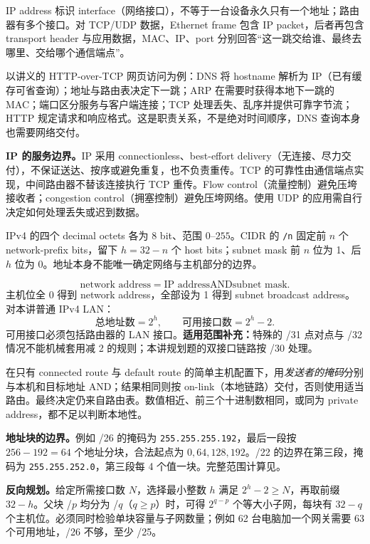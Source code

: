 IP address 标识 interface（网络接口），不等于一台设备永久只有一个地址；路由器有多个接口。对 TCP/UDP 数据，Ethernet frame 包含 IP packet，后者再包含 transport header 与应用数据，MAC、IP、port 分别回答“这一跳交给谁、最终去哪里、交给哪个通信端点”。

以讲义的 HTTP-over-TCP 网页访问为例：DNS 将 hostname 解析为 IP（已有缓存可省查询）；地址与路由表决定下一跳；ARP 在需要时获得本地下一跳的 MAC；端口区分服务与客户端连接；TCP 处理丢失、乱序并提供可靠字节流；HTTP 规定请求和响应格式。这是职责关系，不是绝对时间顺序，DNS 查询本身也需要网络交付。

\textbf{IP 的服务边界。}IP 采用 connectionless、best-effort delivery（无连接、尽力交付），不保证送达、按序或避免重复，也不负责重传。TCP 的可靠性由通信端点实现，中间路由器不替该连接执行 TCP 重传。Flow control（流量控制）避免压垮接收者；congestion control（拥塞控制）避免压垮网络。使用 UDP 的应用需自行决定如何处理丢失或迟到数据。


IPv4 的四个 decimal octets 各为 8 bit、范围 $0$--$255$。CIDR 的 \texttt{/n} 固定前 $n$ 个 network-prefix bits，留下 $h=32-n$ 个 host bits；subnet mask 前 $n$ 位为 1、后 $h$ 位为 0。地址本身不能唯一确定网络与主机部分的边界。

\[
 \boxed{\text{network address}=\text{IP address}\mathbin{\mathrm{AND}}\text{subnet mask}}.
\]
主机位全 0 得到 network address，全部设为 1 得到 subnet broadcast address。对本讲普通 IPv4 LAN：
\[
 \boxed{\text{总地址数}=2^h,\qquad\text{可用接口数}=2^h-2}.
\]
可用接口必须包括路由器的 LAN 接口。\textbf{适用范围补充：}特殊的 /31 点对点与 /32 情况不能机械套用减 2 的规则；本讲规划题的双接口链路按 /30 处理。

在只有 connected route 与 default route 的简单主机配置下，用\emph{发送者的掩码}分别与本机和目标地址 AND；结果相同则按 on-link（本地链路）交付，否则使用适当路由。最终决定仍来自路由表。数值相近、前三个十进制数相同，或同为 private address，都不足以判断本地性。

\textbf{地址块的边界。}例如 /26 的掩码为 \texttt{255.255.255.192}，最后一段按 $256-192=64$ 个地址分块，合法起点为 $0,64,128,192$。/22 的边界在第三段，掩码为 \texttt{255.255.252.0}，第三段每 4 个值一块。完整范围计算见。

\textbf{反向规划。}给定所需接口数 $N$，选择最小整数 $h$ 满足 $2^h-2\geq N$，再取前缀 $32-h$。父块 /$p$ 均分为 /$q$（$q\geq p$）时，可得 $2^{q-p}$ 个等大小子网，每块有 $32-q$ 个主机位。必须同时检验单块容量与子网数量；例如 62 台电脑加一个网关需要 63 个可用地址，/26 不够，至少 /25。

